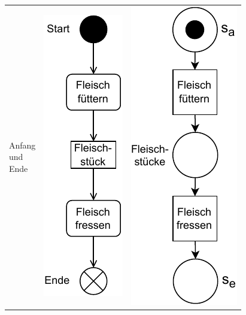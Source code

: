 \begin{longtable}{p{\sttpHilfA}|c|c}
		\hline %

			\parbox{\sttpHilfA}{\centering
				Anfang \\ und \\ Ende } 
		&  
			\parbox{\sttpHilfB}{\centering
				\vspace{\sttpAbstandRand}
				\includegraphics[scale=\sttpFaktor]{Bilder/Kapitel-5/gegenueberstellung_6a.pdf}
				\vspace{\sttpAbstandRand}
			}
		& 
			\parbox{\sttpHilfB}{\centering
				\vspace{\sttpAbstandRand}
				\includegraphics[scale=\sttpFaktor]{Bilder/Kapitel-5/gegenueberstellung_6b.pdf}
				\vspace{\sttpAbstandRand}
			} 
		\\
		

\end{longtable}
